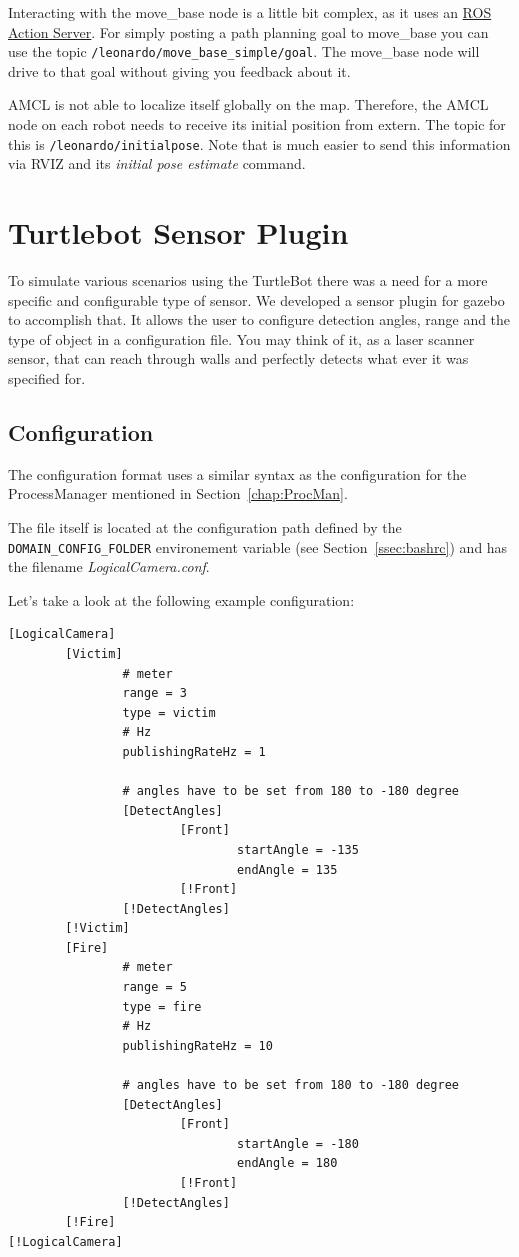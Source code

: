 Interacting with the move\_base node is a little bit complex, as it uses an \href{http://wiki.ros.org/actionlib/Tutorials}{ROS Action Server}. For simply posting a path planning goal to move\_base you can use the topic \verb$/leonardo/move_base_simple/goal$. The move\_base node will drive to that goal without giving you feedback about it. 

AMCL is not able to localize itself globally on the map. Therefore, the AMCL node on each robot needs to receive its initial position from extern. The topic for this is \verb$/leonardo/initialpose$. Note that is much easier to send this information via RVIZ and its \emph{initial pose estimate} command.

\section{Turtlebot Sensor Plugin}

To simulate various scenarios using the TurtleBot there was a need for a more specific and configurable type of sensor. We developed a sensor plugin for gazebo to accomplish that. It allows the user to configure detection angles, range and the type of object in a configuration file. You may think of it, as a laser scanner sensor, that can reach through walls and perfectly detects what ever it was specified for.

\subsection{Configuration}

The configuration format uses a similar syntax as the configuration for the ProcessManager mentioned in Section~\ref{chap:ProcMan}.

The file itself is located at the configuration path defined by the \verb$DOMAIN_CONFIG_FOLDER$ environement variable (see Section~\ref{ssec:bashrc}) and has the filename \textit{LogicalCamera.conf}.

Let's take a look at the following example configuration:

\begin{verbatim}
[LogicalCamera]
        [Victim]
                # meter
                range = 3
                type = victim
                # Hz
                publishingRateHz = 1

                # angles have to be set from 180 to -180 degree
                [DetectAngles]
                        [Front]
                                startAngle = -135
                                endAngle = 135
                        [!Front]
                [!DetectAngles]
        [!Victim]
        [Fire]
                # meter
                range = 5
                type = fire
                # Hz
                publishingRateHz = 10

                # angles have to be set from 180 to -180 degree
                [DetectAngles]
                        [Front]
                                startAngle = -180
                                endAngle = 180
                        [!Front]
                [!DetectAngles]
        [!Fire]
[!LogicalCamera]
\end{verbatim}


